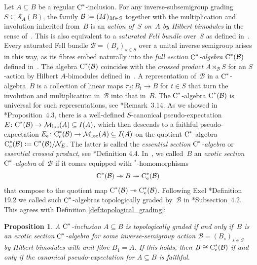 \documentclass[a4paper]{amsart}
\theoremstyle{plain}
\newtheorem{proposition}[theorem]{Proposition}
\theoremstyle{definition}
\theoremstyle{remark}
\numberwithin{theorem}{section}
\numberwithin{equation}{section}
\newcommand*{\nb}{\nobreakdash}
\newcommand*{\Star}{\(^*\)\nobreakdash-}
\newcommand*{\Null}{\mathcal N}%
\newcommand*{\ess}{\mathrm{e}}%
\newcommand*{\Cst}{\textup C^*}%
\newcommand*{\Locmult}{\mathcal{M}_{\mathrm{loc}}}%
\newcommand*{\Slice}{\mathcal S}%
\newcommand*{\B}{\mathcal B}%
\newcommand*{\defeq}{\mathrel{\vcentcolon=}}%
\newcommand*{\onto}{\twoheadrightarrow}
\begin{document}
Let  \(A\subseteq B\) be a regular \(\Cst\)\nb-inclusion.
For any inverse-subsemigroup grading \(S\subseteq \Slice_A(B)\), the
family \(\B\defeq (M)_{M\in S}\) together with the multiplication and
involution inherited from~\(B\) is an \emph{action of~\(S\) on~\(A\)
  by Hilbert bimodules} in the sense
of~\cite{Buss-Meyer:Actions_groupoids}.
This is also equivalent to a \emph{saturated Fell bundle} over~\(S\)
as defined in~\cite{Exel:noncomm.cartan}.
Every saturated Fell bundle \(\B=(B_{s})_{s\in S}\) over a unital
inverse semigroup arises in this way, as its fibres embed naturally
into the \emph{full section \(\Cst\)\nb-algebra} \(\Cst(\B)\)
defined in~\cite{Exel:noncomm.cartan}.
The algebra \(\Cst(\B)\) coincides with the
\emph{crossed product} \(A\rtimes_{\B} S\) for an \(S\)\nb-action by
Hilbert \(A\)\nb-bimodules defined in~\cite{Buss-Exel-Meyer:Reduced}.
A representation of~\(\B\) in a \(\Cst\)\nb-algebra~\(B\) is a
collection of linear maps \(\pi_t\colon B_t\to B\) for \(t\in S\) that
turn the involution and multiplication in~\(\B\) into that in~\(B\).
The \(\Cst\)\nb-algebra \(\Cst(\B)\) is universal for such
representations, see
\cite{Kwasniewski-Meyer:Aperiodicity_pseudo_expectations}*{Remark~3.14}.
As we showed in \cite{Kwasniewski-Meyer:Essential}*{Proposition~4.3},
there is a well-defined \(S\)\nb-canonical pseudo-expectation
\(E\colon \Cst(\B)\to  \Locmult(A)\subseteq I(A)\), which then
descends to a faithful pseudo-expectation \(E_\ess\colon
\Cst_\ess(\B)\to  \Locmult(A)\subseteq I(A)\) on the quotient
\(\Cst\)\nb-algebra \(\Cst_\ess(\B)\defeq \Cst(\B)/\Null_E\).
The latter is called the \emph{essential section
  \(\Cst\)\nb-algebra} or \emph{essential crossed product}, see
\cite{Kwasniewski-Meyer:Essential}*{Definition 4.4}.
In~\cite{Kwasniewski-Meyer:Essential}, we called~\(B\) an \emph{exotic
section \(\Cst\)\nb-algebra} of~\(\B\) if it comes equipped with
\Star{}homomorphisms
\[
\Cst(\B) \onto B\onto \Cst_\ess(\B)
\]
that compose to the quotient map \(\Cst(\B)\onto \Cst_\ess(\B)\).
Following Exel \cite{Exel:Partial_dynamical}*{Definition 19.2} we
called such \(\Cst\)\nb-algebras topologically graded by~\(\B\) in
\cite{Kwasniewski-Meyer:Essential}*{Subsection~4.2}.
This agrees with Definition \ref{def:topological_grading}:

\begin{proposition}
  \label{prop:topological_grading_characterisation}
  A \(\Cst\)\nb-inclusion \(A\subseteq B\) is topologically graded if
  and only if~\(B\) is an exotic section \(\Cst\)\nb-algebra for some
  inverse-semigroup action \(\B=(B_{s})_{s\in S}\)  by Hilbert
  bimodules with unit fibre \(B_1=A\).
  If this holds, then \(B\cong\Cst_\ess(\B)\) if and only if  the
  canonical pseudo-expectation for \(A\subseteq B\) is faithful.
\end{proposition}
\end{document}
